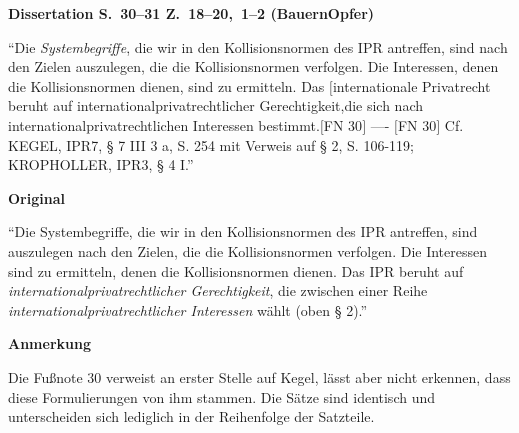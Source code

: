 \documentclass[ngerman,final,fontsize=12pt,paper=a4,twoside,bibliography=totocnumbered,BCOR=8mm,draft=false]{scrartcl}
\newenvironment{fragment}
	{\begin{snugshade}}
	{\end{snugshade}
	 \penalty-200
	 \vskip 0pt plus 10mm minus 5mm}
\newenvironment{fragmentpart}[1]
	{\noindent\textbf{#1}\par\penalty500}
	{\par}
\begin{document}
\hypertarget{Lm-Fragment-030-18}{}
\begin{fragment}
\begin{fragmentpart}{Dissertation S.~30--31 Z.~18--20,~1--2 (BauernOpfer)}
\enquote{Die \textsl{Systembegriffe}, die wir in den Kollisionsnormen des IPR antreffen, sind nach den Zielen auszulegen, die die Kollisionsnormen verfolgen. Die Interessen, denen die Kollisionsnormen dienen, sind zu ermitteln. Das $[$internationale Privatrecht beruht auf internationalprivatrechtlicher Gerechtigkeit,die sich nach internationalprivatrechtlichen Interessen bestimmt.$[$FN 30$]$
----
$[$FN 30$]$ Cf. KEGEL, IPR7, § 7 III 3 a, S. 254 mit Verweis auf § 2, S. 106-119; KROPHOLLER, IPR3, § 4 I.}
\end{fragmentpart}
\begin{fragmentpart}{Original \cite[S.~254 Z.~3--7]{Kegel-1995}}
\enquote{Die Systembegriffe, die wir in den Kollisionsnormen des IPR antreffen, sind auszulegen nach den Zielen, die die Kollisionsnormen verfolgen. Die Interessen sind zu ermitteln, denen die Kollisionsnormen dienen. Das IPR beruht auf \textsl{internationalprivatrechtlicher Gerechtigkeit}, die zwischen einer Reihe \textsl{internationalprivatrechtlicher Interessen} wählt (oben § 2).}
\end{fragmentpart}
\begin{fragmentpart}{Anmerkung}
Die Fußnote 30 verweist an erster Stelle auf Kegel, lässt aber nicht erkennen, dass diese Formulierungen von ihm stammen. Die Sätze sind identisch und unterscheiden sich lediglich in der Reihenfolge der Satzteile.
\end{fragmentpart}
\end{fragment}
\hypertarget{Lm-Fragment-031-04}{}
\end{document}
